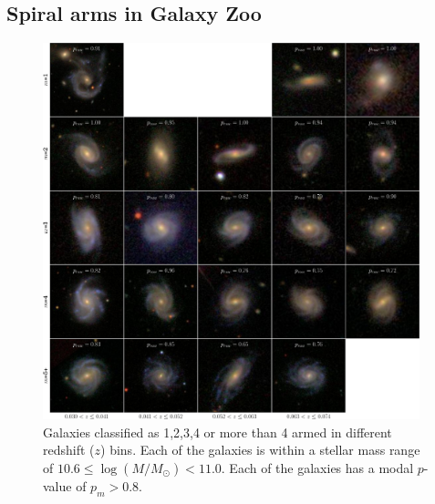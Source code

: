 \documentclass[useAMS,usenatbib]{mn2e}
\begin{document}
\subsection{Spiral arms in Galaxy Zoo}
\label{sec:defining_the_sample}

\begin{figure}
		\centering

        \includegraphics[width=0.975\textwidth]{Images/Results/image_page_p0810_m106110.pdf}

        \caption{Galaxies classified as 1,2,3,4 or more than 4 armed in different redshift ($z$) bins. Each of the galaxies is within a stellar mass range of $10.6 \leq \log(M/M_{\odot}) < 11.0$. Each of the galaxies has a modal $p$-value of $p_m > 0.8$.}

        \label{fig:image_panel_secure}

\end{figure}
\end{document}
